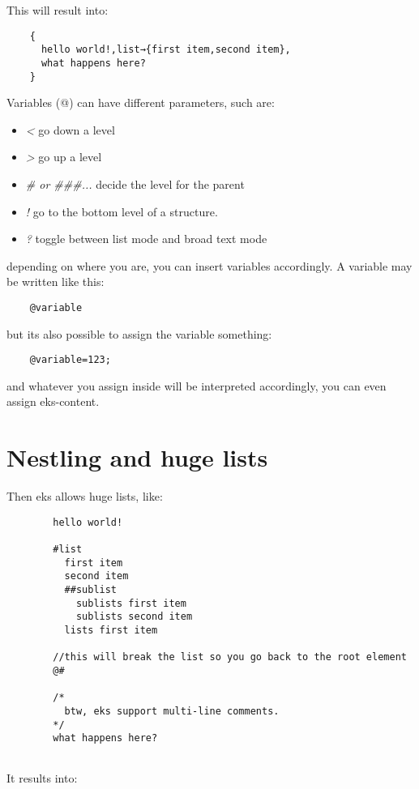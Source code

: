 \documentclass{book}
\begin{document}
	This will result into:
	
	\begin{verbatim}
	{
	  hello world!,list→{first item,second item},
	  what happens here?
	}
	\end{verbatim}
	
	Variables (@) can have different parameters, such are:
	\begin{itemize}
		\item \emph{<} go down a level
		\item \emph{>} go up a level
		\item \emph{# or ###...} decide the level for the parent
		\item \emph{!} go to the bottom level of a {} structure.
		\item \emph{?} toggle between list mode and broad text mode
	\end{itemize}
	depending on where you are, you can insert variables accordingly. A variable may be written like this:
	
	\begin{verbatim}
	@variable
	\end{verbatim}
	
	but its also possible to assign the variable something:
	
	\begin{verbatim}
	@variable=123;
	\end{verbatim}
	
	and whatever you assign inside will be interpreted accordingly, you can even assign eks-content.
	
	\section{Nestling and huge lists}
	
	Then eks allows huge lists, like:
	
	\begin{verbatim}
		hello world!
		
		#list
		  first item
		  second item
		  ##sublist
		    sublists first item
		    sublists second item
		  lists first item
		  
		//this will break the list so you go back to the root element
		@#
		
		/*
		  btw, eks support multi-line comments.
		*/
		what happens here?
		
	\end{verbatim}
	
	It results into:
	
\end{document}
